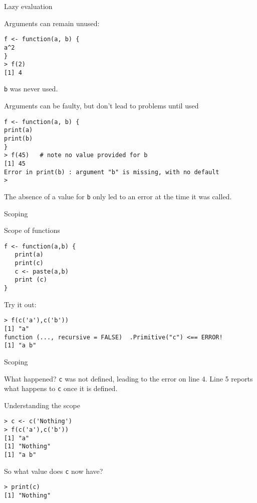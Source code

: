 \documentclass[xcolor=table,compress]{beamer}
\begin{document}
\begin{frame}[fragile]{Lazy evaluation}
\begin{block}{Arguments can remain unused:}

\begin{lstlisting}[numbers=none]
f <- function(a, b) {
a^2
}
> f(2)
[1] 4
\end{lstlisting}
\texttt{b} was never used.
\end{block}
\begin{block}{Arguments can be faulty, but don't lead to problems until used }
\begin{lstlisting}[numbers=none]
f <- function(a, b) {
print(a)
print(b)
}
> f(45)   # note no value provided for b
[1] 45
Error in print(b) : argument "b" is missing, with no default
>
\end{lstlisting}
The absence of a value for \texttt{b} only led to an error at the time it was called.
\end{block}
\end{frame}

\begin{frame}[fragile]{Scoping}
\begin{block}{Scope of functions}

\begin{lstlisting}[numbers=none]
f <- function(a,b) {
   print(a)
   print(c)
   c <- paste(a,b)
   print (c)
}
\end{lstlisting}
\lstset{numbers=left}
Try it out:\pause
\begin{lstlisting}
> f(c('a'),c('b'))
[1] "a"
function (..., recursive = FALSE)  .Primitive("c") <== ERROR!
[1] "a b"
\end{lstlisting}
\end{block}
\end{frame}

\begin{frame}[fragile]{Scoping}
\begin{block}{What happened?}
\texttt{c} was not defined, leading to the error on line 4. Line 5 reports what happens to \texttt{c} once it is defined.
\end{block}
\begin{block}{Understanding the scope}
\begin{lstlisting}[firstnumber=last]
> c <- c('Nothing')
> f(c('a'),c('b'))
[1] "a"
[1] "Nothing"
[1] "a b"
\end{lstlisting}
So what value does \texttt{c} now have?\pause
\begin{lstlisting}[firstnumber=last]
> print(c)
[1] "Nothing"
\end{lstlisting}
\end{block}
\end{frame}
\end{document}
